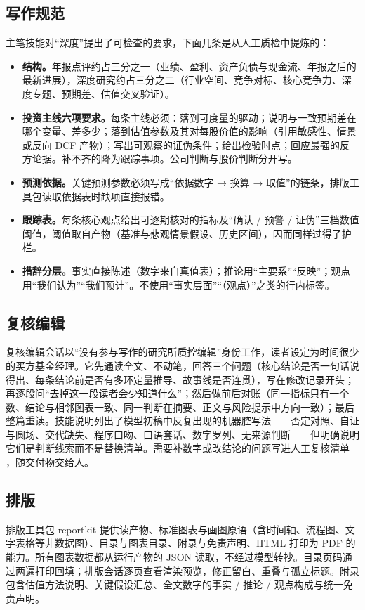 \subsection{写作规范}
\label{sec:writing}
主笔技能对“深度”提出了可检查的要求，下面几条是从人工质检中提炼的：
\begin{itemize}
  \item \textbf{结构。}年报点评约占三分之一（业绩、盈利、资产负债与现金流、年报之后的最新进展），深度研究约占三分之二（行业空间、竞争对标、核心竞争力、深度专题、预期差、估值交叉验证）。
  \item \textbf{投资主线六项要求。}每条主线必须：落到可度量的驱动；说明与一致预期差在哪个变量、差多少；落到估值参数及其对每股价值的影响（引用敏感性、情景或反向 DCF 产物）；写出可观察的证伪条件；给出检验时点；回应最强的反方论据。补不齐的降为跟踪事项。公司判断与股价判断分开写。
  \item \textbf{预测依据。}关键预测参数必须写成“依据数字 → 换算 → 取值”的链条，排版工具包读取依据表时缺项直接报错。
  \item \textbf{跟踪表。}每条核心观点给出可逐期核对的指标及“确认 / 预警 / 证伪”三档数值阈值，阈值取自产物（基准与悲观情景假设、历史区间），因而同样过得了护栏。
  \item \textbf{措辞分层。}事实直接陈述（数字来自真值表）；推论用“主要系”“反映”；观点用“我们认为”“我们预计”。不使用“事实层面”“（观点）”之类的行内标签。
\end{itemize}

\subsection{复核编辑}
复核编辑会话以“没有参与写作的研究所质控编辑”身份工作，读者设定为时间很少的买方基金经理。它先通读全文、不动笔，回答三个问题（核心结论是否一句话说得出、每条结论前是否有多环定量推导、故事线是否连贯），写在修改记录开头；再逐段问“去掉这一段读者会少知道什么”；然后做前后对账（同一指标只有一个数、结论与相邻图表一致、同一判断在摘要、正文与风险提示中方向一致）；最后整篇重读。技能说明列出了模型初稿中反复出现的机器腔写法——否定对照、自证与圆场、交代缺失、程序口吻、口语套话、数字罗列、无来源判断——但明确说明它们是判断线索而不是替换清单。需要补数字或改结论的问题写进人工复核清单 ，随交付物交给人。

\subsection{排版}
排版工具包 reportkit 提供读产物、标准图表与画图原语（含时间轴、流程图、文字表格等非数据图）、目录与图表目录、附录与免责声明、HTML 打印为 PDF 的能力。所有图表数据都从运行产物的 JSON 读取，不经过模型转抄。目录页码通过两遍打印回填；排版会话逐页查看渲染预览，修正留白、重叠与孤立标题。附录包含估值方法说明、关键假设汇总、全文数字的事实 / 推论 / 观点构成与统一免责声明。
